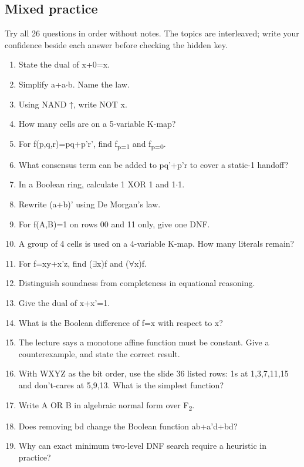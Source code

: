\documentclass[11pt]{article}
\begin{document}
\begin{keepsection}
\section{Mixed practice}

Try all 26 questions in order without notes. The topics are interleaved; write your confidence beside each answer before checking the hidden key.

\begin{enumerate}
\item State the dual of x+0=x.
\item Simplify a+a\ensuremath{\cdot}b. Name the law.
\item Using NAND ↑, write NOT x.
\item How many cells are on a 5-variable K-map?
\item For f(p,q,r)=pq+p'r', find f\textsubscript{p=1} and f\textsubscript{p=0}.
\item What consensus term can be added to pq'+p'r to cover a static-1 handoff?
\item In a Boolean ring, calculate 1 XOR 1 and 1\ensuremath{\cdot}1.
\item Rewrite (a+b)' using De Morgan’s law.
\item For f(A,B)=1 on rows 00 and 11 only, give one DNF.
\item A group of 4 cells is used on a 4-variable K-map. How many literals remain?
\item For f=xy+x'z, find (\ensuremath{\exists}x)f and (\ensuremath{\forall}x)f.
\item Distinguish soundness from completeness in equational reasoning.
\item Give the dual of x+x'=1.
\item What is the Boolean difference of f=x with respect to x?
\item The lecture says a monotone affine function must be constant. Give a counterexample, and state the correct result.
\item With WXYZ as the bit order, use the slide 36 listed rows: 1s at 1,3,7,11,15 and don’t-cares at 5,9,13. What is the simplest function?
\item Write A OR B in algebraic normal form over F\textsubscript{2}.
\item Does removing bd change the Boolean function ab+a'd+bd?
\item Why can exact minimum two-level DNF search require a heuristic in practice?

\end{enumerate}
\end{keepsection}
\end{document}
